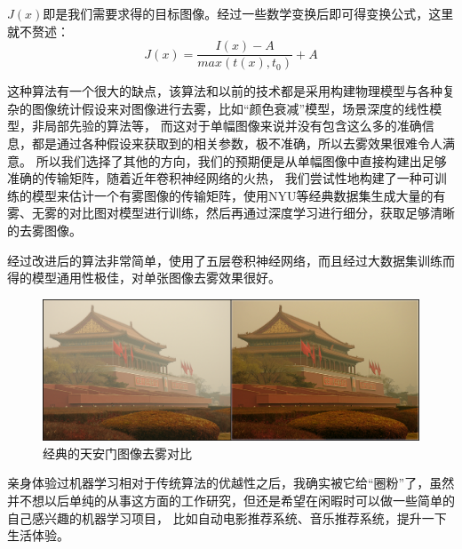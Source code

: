 \documentclass{article}
\begin{document}
$J\left ( x \right )$即是我们需要求得的目标图像。经过一些数学变换后即可得变换公式，这里就不赘述：
\begin{equation}
    J\left ( x \right )=\frac{I\left ( x \right )-A}{max(t\left ( x \right ),t_{0})}+A
\end{equation}\par
这种算法有一个很大的缺点，该算法和以前的技术都是采用构建物理模型与各种复杂的图像统计假设来对图像进行去雾，比如“颜色衰减”模型，场景深度的线性模型，非局部先验的算法等，
而这对于单幅图像来说并没有包含这么多的准确信息，都是通过各种假设来获取到的相关参数，极不准确，所以去雾效果很难令人满意。
所以我们选择了其他的方向，我们的预期便是从单幅图像中直接构建出足够准确的传输矩阵，随着近年卷积神经网络的火热，
我们尝试性地构建了一种可训练的模型来估计一个有雾图像的传输矩阵，使用NYU等经典数据集生成大量的有雾、无雾的对比图对模型进行训练，然后再通过深度学习进行细分，获取足够清晰的去雾图像。\par
经过改进后的算法非常简单，使用了五层卷积神经网络，而且经过大数据集训练而得的模型通用性极佳，对单张图像去雾效果很好。\par
\begin{figure}[ht]
\centering
\includegraphics[scale=0.3]{dehaze1.png}
\caption{经典的天安门图像去雾对比}
\label{fig:label}
\end{figure}
亲身体验过机器学习相对于传统算法的优越性之后，我确实被它给“圈粉”了，虽然并不想以后单纯的从事这方面的工作研究，但还是希望在闲暇时可以做一些简单的自己感兴趣的机器学习项目，
比如自动电影推荐系统、音乐推荐系统，提升一下生活体验。
\end{document}
